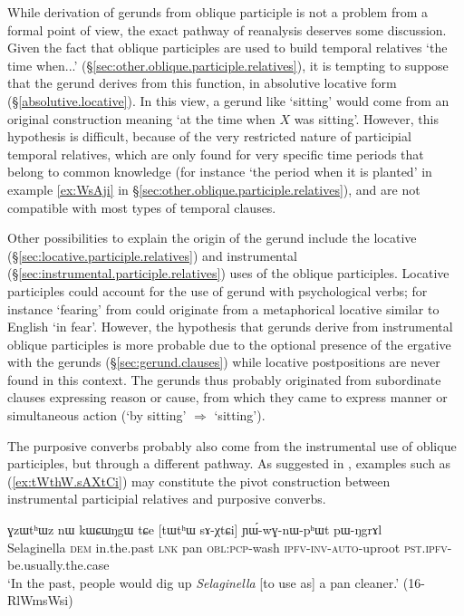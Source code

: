 While derivation of gerunds from oblique participle is not a problem from a formal point of view, the exact pathway of reanalysis deserves some discussion. Given the fact that oblique participles are used to build temporal relatives `the time when...' (§\ref{sec:other.oblique.participle.relatives}), it is tempting to suppose that the gerund derives from this function, in absolutive locative form (§\ref{absolutive.locative}). In this view, a gerund like  `sitting' would come from an original construction meaning `at the time when $X$ was sitting'. However, this hypothesis is difficult, because of the very restricted nature of participial temporal relatives, which are only found for very specific time periods that belong to common knowledge (for instance  `the period when it is planted' in example \ref{ex:WsAji} in §\ref{sec:other.oblique.participle.relatives}), and are not compatible with most types of temporal clauses.

Other possibilities to explain the origin of the gerund include the locative (§\ref{sec:locative.participle.relatives}) and instrumental (§\ref{sec:instrumental.participle.relatives}) uses of the oblique participles. Locative participles could account for the use of gerund with psychological verbs; for instance  `fearing' from  could originate from a metaphorical locative similar to English `in fear'. However, the hypothesis that gerunds derive from instrumental oblique participles is more probable due to the optional presence of the ergative  with the gerunds (§\ref{sec:gerund.clauses}) while locative postpositions are never found in this context. The gerunds thus probably originated from subordinate clauses expressing reason or cause, from which they came to express manner or simultaneous action (`by sitting' $\Rightarrow$ `sitting').

The purposive converbs probably also come from the instrumental use of oblique participles, but through a different pathway. As suggested in \citet[272]{jacques14linking}, examples such as (\ref{ex:tWthW.sAXtCi}) may constitute the pivot construction between instrumental participial relatives and purposive converbs.


\begin{exe}
\ex \label{ex:tWthW.sAXtCi}
\gll ɣzɯtʰɯz nɯ kɯɕɯŋgɯ tɕe [tɯtʰɯ sɤ-χtɕi] ɲɯ́-wɣ-nɯ-pʰɯt pɯ-ŋgrɤl \\
Selaginella \textsc{dem} in.the.past \textsc{lnk} pan \textsc{obl}:\textsc{pcp}-wash \textsc{ipfv}-\textsc{inv}-\textsc{auto}-uproot \textsc{pst}.\textsc{ipfv}-be.usually.the.case \\
\glt `In the past, people would dig up \textit{Selaginella} [to use as] a pan cleaner.' (16-RlWmsWsi)
\end{exe}

